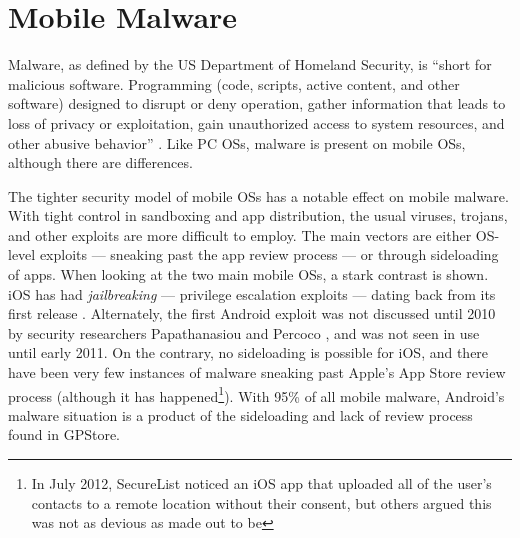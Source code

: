 
\section{Mobile Malware}
Malware, as defined by the US Department of Homeland Security, is ``short for malicious software. Programming (code, scripts, active content, and other software) designed to disrupt or deny operation, gather information that leads to loss of privacy or exploitation, gain unauthorized access to system resources, and other abusive behavior'' \citep{nash2005undirected}. Like PC OSs, malware is present on mobile OSs, although there are differences.


The tighter security model of mobile OSs has a notable effect on mobile malware. With tight control in sandboxing and app distribution, the usual viruses, trojans, and other exploits are more difficult to employ. The main vectors are either OS-level exploits --- sneaking past the app review process --- or through sideloading of apps. When looking at the two main mobile OSs, a stark contrast is shown. iOS has had  \textit{jailbreaking} --- privilege escalation exploits --- dating back from its first release \citep{damopoulos2011isam}. Alternately, the first Android exploit was not discussed until 2010 by security researchers Papathanasiou and Percoco \citep{papathanasiou2010not}, and was not seen in use until early 2011\citep{castillo2010android}. On the contrary, no sideloading is possible for iOS, and there have been very few instances of malware sneaking past Apple's App Store review process (although it has happened\footnote{In July 2012, SecureList noticed an iOS app that uploaded all of the user's contacts to a remote location without their consent\citep{SecureList2012}, but others argued this was not as devious as made out to be\citep{trendmicroios2012} }). With 95\% of all mobile malware\citep{nq2013}, Android's malware situation is a product of the sideloading and lack of review process found in GPStore\citep{nq2013}. %

